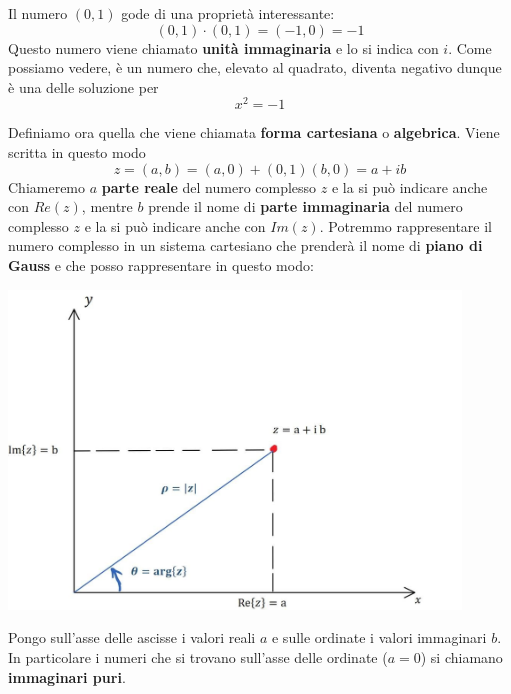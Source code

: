Il numero $(0, 1)$ gode di una propriet\`a interessante:
\begin{equation*}
	(0, 1) \cdot (0, 1) = (-1, 0) = -1
\end{equation*}
Questo numero viene chiamato \textbf{unit\`a immaginaria} e lo si indica con $i$. Come possiamo
vedere, \`e un numero che, elevato al quadrato, diventa negativo dunque \`e una delle soluzione
per
\begin{equation*}
	x^2 = -1
\end{equation*}

\begin{defn}
	Definiamo ora quella che viene chiamata \textbf{forma cartesiana} o \textbf{algebrica}.
	Viene scritta in questo modo
	\begin{equation*}
		z = (a, b) = (a, 0) + (0, 1)(b, 0) = a + ib
	\end{equation*}
	Chiameremo $a$ \textbf{parte reale} del numero complesso $z$ e la si pu\`o indicare anche con
	$Re(z)$, mentre $b$ prende il nome di \textbf{parte immaginaria} del numero complesso $z$ e la
	si pu\`o indicare anche con $Im(z)$.
	Potremmo rappresentare il numero complesso in un sistema cartesiano che prender\`a il nome di
	\textbf{piano di Gauss} e che posso rappresentare in questo modo:

	\includegraphics[width=0.9\textwidth]{immagini/Gauss}

	Pongo sull'asse delle ascisse i valori reali $a$ e sulle ordinate i valori immaginari $b$.
	In particolare i numeri che si trovano sull'asse delle ordinate ($a = 0$) si chiamano
	\textbf{immaginari puri}.
\end{defn}

